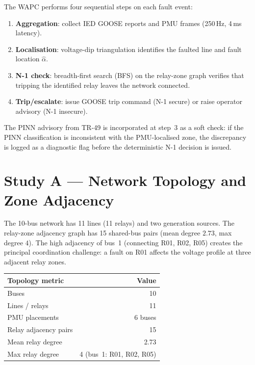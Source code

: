 \documentclass[11pt,a4paper]{article}
\begin{document}
\noindent
The WAPC performs four sequential steps on each fault event:
\begin{enumerate}
  \item \textbf{Aggregation}: collect IED GOOSE reports and PMU frames
    (250\,Hz, 4\,ms latency).
  \item \textbf{Localisation}: voltage-dip triangulation identifies the
    faulted line and fault location $\hat\alpha$.
  \item \textbf{N-1 check}: breadth-first search (BFS) on the relay-zone
    graph verifies that tripping the identified relay leaves the network
    connected.
  \item \textbf{Trip/escalate}: issue GOOSE trip command (N-1 secure) or
    raise operator advisory (N-1 insecure).
\end{enumerate}

The PINN advisory from TR-49 is incorporated at step~3 as a soft check:
if the PINN classification is inconsistent with the PMU-localised zone,
the discrepancy is logged as a diagnostic flag before the deterministic
N-1 decision is issued.

\section{Study A --- Network Topology and Zone Adjacency}
\label{sec:studyA}

The 10-bus network has 11 lines (11 relays) and two generation sources.
The relay-zone adjacency graph has 15 shared-bus pairs (mean degree
$2.73$, max degree $4$).  The high adjacency of bus~1 (connecting R01, R02,
R05) creates the principal coordination challenge: a fault on R01 affects
the voltage profile at three adjacent relay zones.

\begin{center}
\begin{tabular}{@{}lr@{}}
\toprule
Topology metric & Value \\
\midrule
Buses & 10 \\
Lines / relays & 11 \\
PMU placements & 6 buses \\
Relay adjacency pairs & 15 \\
Mean relay degree & 2.73 \\
Max relay degree & 4 (bus~1: R01, R02, R05) \\
\bottomrule
\end{tabular}
\end{center}
\end{document}
